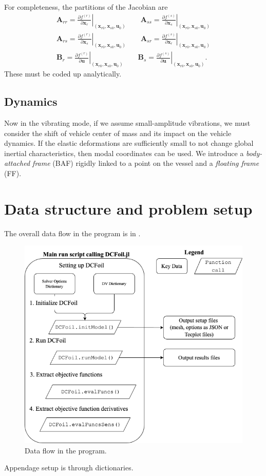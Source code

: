 \documentclass[10pt]{article}
\newcommand{\pp}[2]{\frac{\partial #1}{\partial #2}}
\newcommand{\mbf}[1]{\mathbf{#1}}
\newcommand{\beq}{\begin{equation}\begin{aligned}}
\newcommand{\eeq}{\end{aligned}\end{equation}}
\begin{document}
For completeness, the partitions of the Jacobian are
\beq
\mbf{A}_{rr} = \left. \pp{f^{(r)}}{\mbf{x}_r} \right|_{(\mbf{x}_{r0}, \mbf{x}_{s0}, \mbf{u}_0)}
\qquad
\mbf{A}_{ss} = \left. \pp{f^{(s)}}{\mbf{x}_s} \right|_{(\mbf{x}_{r0}, \mbf{x}_{s0}, \mbf{u}_0)}
\\
\mbf{A}_{rs} = \left. \pp{f^{(r)}}{\mbf{x}_s} \right|_{(\mbf{x}_{r0}, \mbf{x}_{s0}, \mbf{u}_0)}
\qquad
\mbf{A}_{sr} = \left. \pp{f^{(s)}}{\mbf{x}_r} \right|_{(\mbf{x}_{r0}, \mbf{x}_{s0}, \mbf{u}_0)}
\\
\mbf{B}_{r} = \left. \pp{f^{(r)}}{\mbf{u}} \right|_{(\mbf{x}_{r0}, \mbf{x}_{s0}, \mbf{u}_0)}
\qquad
\mbf{B}_{s} = \left. \pp{f^{(s)}}{\mbf{u}} \right|_{(\mbf{x}_{r0}, \mbf{x}_{s0}, \mbf{u}_0)}.
\eeq
These must be coded up analytically.

\subsection{Dynamics}
Now in the vibrating mode, if we assume small-amplitude vibrations, we must consider the shift of vehicle center of mass and its impact on the vehicle dynamics.
If the elastic deformations are sufficiently small to not change global inertial characteristics, then modal coordinates can be used.
We introduce a \emph{body-attached frame} (BAF) rigidly linked to a point on the vessel and a \emph{floating frame} (FF).

\section{Data structure and problem setup}

The overall data flow in the program is in .
\begin{figure}[htb!]
    \centering
    \includegraphics[width=\linewidth,clip,trim={0cm 0cm 0cm 0cm}]{dataFlow.png}
    \caption{\label{fig:DataFlow}Data flow in the program.}
\end{figure}
Appendage setup is through dictionaries.
\end{document}
